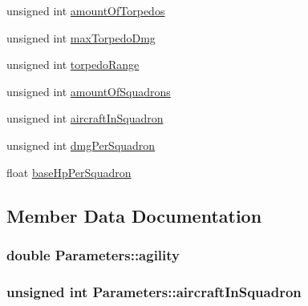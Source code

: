 \begin{DoxyCompactItemize}
\item 
unsigned int \hyperlink{struct_parameters_a53565b1bc98a61d79bd1f3c3b972e660}{amount\+Of\+Torpedos}
\item 
unsigned int \hyperlink{struct_parameters_a7c7434bba4d5209f8aa4d7c8ebcb8d64}{max\+Torpedo\+Dmg}
\item 
unsigned int \hyperlink{struct_parameters_aa0d7436c6b7ab9ec385fd13c6c957e58}{torpedo\+Range}
\item 
unsigned int \hyperlink{struct_parameters_a1217bb1ae5b1f5a5be2fbb91d1e27f33}{amount\+Of\+Squadrons}
\item 
unsigned int \hyperlink{struct_parameters_a827e9fb50cae3ec06d1fb3a5403e4975}{aircraft\+In\+Squadron}
\item 
unsigned int \hyperlink{struct_parameters_aeeafe82e2ab1457e0f8ecd7867e20022}{dmg\+Per\+Squadron}
\item 
float \hyperlink{struct_parameters_a17b4dc8d1fd6e19bef781d65d6578e83}{base\+Hp\+Per\+Squadron}
\end{DoxyCompactItemize}


\subsection{Member Data Documentation}
\subsubsection[{\texorpdfstring{agility}{agility}}]{\setlength{\rightskip}{0pt plus 5cm}double Parameters\+::agility}\hypertarget{struct_parameters_a7963432ebc43abe0bae0891dec48a987}{}\label{struct_parameters_a7963432ebc43abe0bae0891dec48a987}
\subsubsection[{\texorpdfstring{aircraft\+In\+Squadron}{aircraftInSquadron}}]{\setlength{\rightskip}{0pt plus 5cm}unsigned int Parameters\+::aircraft\+In\+Squadron}\hypertarget{struct_parameters_a827e9fb50cae3ec06d1fb3a5403e4975}{}\label{struct_parameters_a827e9fb50cae3ec06d1fb3a5403e4975}
